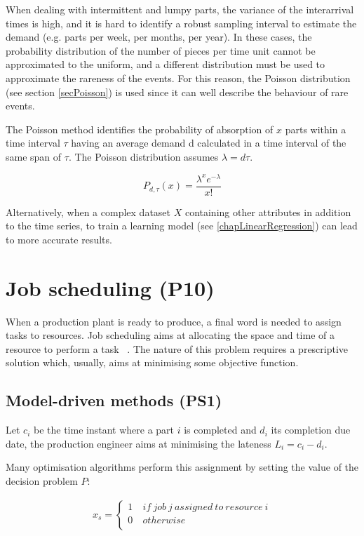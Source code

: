 When dealing with intermittent and lumpy parts, the variance of the interarrival times is high, and it is hard to identify a robust sampling interval to estimate the demand (e.g. parts per week, per months, per year). In these cases, the probability distribution of the number of pieces per time unit cannot be approximated to the uniform, and a different distribution must be used to approximate the rareness of the events. For this reason, the Poisson distribution (see section \ref{secPoisson}) is used since it can well describe the behaviour of rare events.\par

The Poisson method identifies the probability of absorption of $x$ parts within a time interval $\tau$ having an average demand d calculated in a time interval of the same span of $\tau$. The Poisson distribution assumes $\lambda=d\tau$.

\begin{equation}
    P_{d,\tau}\left(x\right)=\frac{\lambda^xe^{-\lambda}}{x!}
\end{equation}

Alternatively, when a complex dataset $X$ containing other attributes in addition to the time series, to train a learning model (see \ref{chapLinearRegression}) can lead to more accurate results.

\section{Job scheduling (P10)} \label{secJobScheduling}
When a production plant is ready to produce, a final word is needed to assign tasks to resources. Job scheduling aims at allocating the space and time of a resource to perform a task ~\cite{Lim2014}. The nature of this problem requires a prescriptive solution which, usually, aims at minimising some objective function.

\subsection{Model-driven methods (PS1)}
Let $c_i$ be the time instant where a part $i$ is completed and $d_i$ its completion due date, the production engineer aims at minimising the lateness $L_i=c_i-d_i$.\par

Many optimisation algorithms perform this assignment by setting the value of the decision problem $P$:

\begin{equation}
   \begin{split}
   x_s=\left\{
                \begin{array}{ll}
                  1\ & if\ job\ j\ assigned\ to\ resource\ i\\
                  0 & otherwise\\
                \end{array}
              \right.
   \end{split}
\end{equation}

